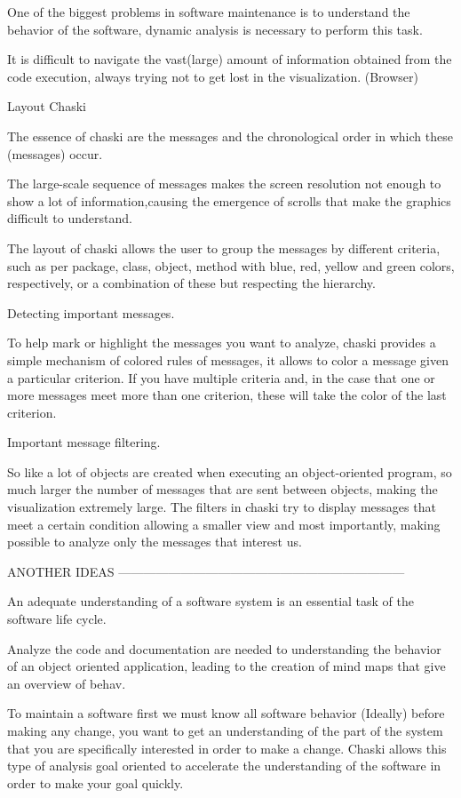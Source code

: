 \documentclass{elsart}
\begin{document}
One of the biggest problems in software maintenance is to understand the behavior of the software, dynamic analysis is necessary to perform this task.

It is difficult to navigate the vast(large) amount of information obtained from the code execution, always trying not to get lost in the visualization. (Browser)


Layout Chaski

The essence of chaski are the messages and the chronological order in which these (messages) occur.

The large-scale sequence of messages makes the screen resolution not enough to show a lot of information,causing the emergence of scrolls that make the graphics difficult to understand.

The layout of chaski allows the user to group the messages by different criteria, such as per package, class, object, method with blue, red, yellow and green colors, respectively, or a combination of these but respecting the hierarchy.

Detecting important messages.

To help mark or highlight the messages you want to analyze, chaski provides a simple mechanism of colored rules of messages, it allows to color a message given a particular criterion. If you have multiple criteria and, in the case that one or more messages meet more than one criterion, these will take the color of the last criterion.

Important message filtering.

So like a lot of objects are created when executing an object-oriented program,  so much larger the number of messages that are sent between objects, making the visualization extremely large. The filters in chaski try to display messages that meet a certain condition allowing a smaller view and most importantly, making  possible to analyze only the messages that interest us.



ANOTHER IDEAS
---------------------------------------------------------------------

An adequate understanding of a software system is an essential task of the software life cycle.

Analyze the code and documentation are needed to understanding the behavior of an object oriented application,  leading to the creation of mind maps that give an overview of behav.

To maintain a software first we must know all software behavior (Ideally) before making any change, you want to get an understanding of the part of the system that you are specifically interested in order to make a change. Chaski allows this type of analysis goal oriented to accelerate the understanding of the software in order to make your goal quickly.
\end{document}
